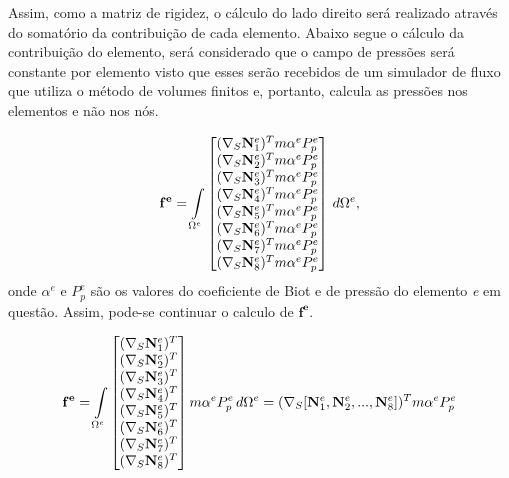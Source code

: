 Assim, como a matriz de rigidez, o cálculo do lado direito será realizado através do somatório da contribuição de cada elemento. Abaixo segue o cálculo da contribuição do elemento, será considerado que o campo de pressões será constante por elemento visto que esses serão recebidos de um simulador de fluxo que utiliza o método de volumes finitos e, portanto, calcula as pressões nos elementos e não nos nós.

\begin{equation}
    \mathbf{f^e} = \omeeint{\begin{bmatrix}
(\sopnabla \basefunctionelem[1])^T m \alpha^e P^e_p
\\ 
(\sopnabla \basefunctionelem[2])^T m \alpha^e P^e_p
\\ 
(\sopnabla \basefunctionelem[3])^T m \alpha^e P^e_p
\\ 
(\sopnabla \basefunctionelem[4])^T m \alpha^e P^e_p
\\ 
(\sopnabla \basefunctionelem[5])^T m \alpha^e P^e_p
\\ 
(\sopnabla \basefunctionelem[6])^T m \alpha^e P^e_p
\\ 
(\sopnabla \basefunctionelem[7])^T m \alpha^e P^e_p
\\ 
(\sopnabla \basefunctionelem[8])^T m \alpha^e P^e_p
\end{bmatrix}},
\end{equation}
onde $\alpha^e$ e $P^e_p$ são os valores do coeficiente de Biot e de pressão do elemento \textit{e} em questão. Assim, pode-se continuar o calculo de $\mathbf{f^e}$.


\begin{equation}
\mathbf{f^e} = \omeeint{\begin{bmatrix}
(\sopnabla \basefunctionelem[1])^T 
\\ 
(\sopnabla \basefunctionelem[2])^T 
\\ 
(\sopnabla \basefunctionelem[3])^T 
\\ 
(\sopnabla \basefunctionelem[4])^T 
\\ 
(\sopnabla \basefunctionelem[5])^T 
\\ 
(\sopnabla \basefunctionelem[6])^T 
\\ 
(\sopnabla \basefunctionelem[7])^T 
\\ 
(\sopnabla \basefunctionelem[8])^T 
\end{bmatrix} m \alpha^e P^e_p }
 = (\sopnabla [\basefunctionelem[1], \basefunctionelem[2], ..., \basefunctionelem[8]])^T m \alpha^e P^e_p
\end{equation}

